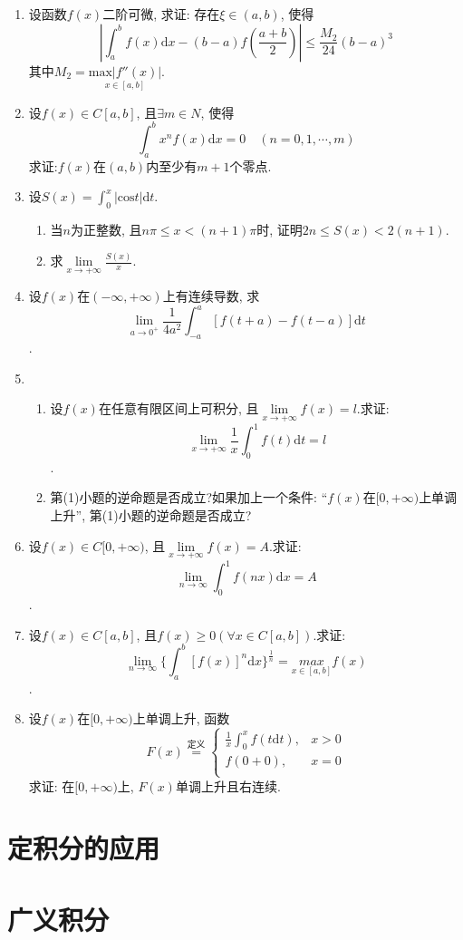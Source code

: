 \begin{enumerate}
\item 设函数$f(x)$二阶可微, 求证: 存在$\xi\in(a,b)$, 使得$$
	\displaystyle{|\int_{a}^{b}f(x)\mathrm{d}x-(b-a)f(\frac{a+b}{2})|\le \frac{M_2}{24}(b-a)^3}$$
	其中$M_2=\underset{x\in [a,b]}{\mathrm{max}|f''(x)|}$.
\item 设$f(x)\in C[a,b]$, 且$\exists m\in N$, 使得$$
\displaystyle{\int_{a}^{b}x^nf(x)\mathrm{d}x=0\quad (n=0,1,\cdots,m)}$$
求证:$f(x)$在$(a,b)$内至少有$m+1$个零点.
\item 设$S(x)=\displaystyle{\int_{0}^{x}|\mathrm{cos}t|\mathrm{d}t}$.
\begin{enumerate}
	\item 当$n$为正整数, 且$n\pi \le x <(n+1)\pi$时, 证明$2n\le S(x)<2(n+1)$.
	\item 求$\lim\limits_{x\rightarrow +\infty}\frac{S(x)}{x}$.
\end{enumerate} 
\item 设$f(x)$在$(-\infty,+\infty)$上有连续导数, 求
$$\lim\limits_{a\rightarrow 0^+}\frac{1}{4a^2}\int_{-a}^{a}[f(t+a)-f(t-a)]\mathrm{d}t $$.
\item 
\begin{enumerate}
	\item 设$f(x)$在任意有限区间上可积分, 且$\lim\limits_{x\rightarrow +\infty}f(x)=l$.求证:
	$$\lim\limits_{x\rightarrow +\infty}\frac{1}{x}\int_{0}^{1}f(t)\mathrm{d}t = l$$.
	\item  第(1)小题的逆命题是否成立?如果加上一个条件: “$f(x)$在$[0,+\infty)$上单调上升”, 第(1)小题的逆命题是否成立?
\end{enumerate}
\item 设$f(x)\in C[0,+\infty)$, 且$\lim\limits_{x\rightarrow +\infty}f(x)=A$.求证:
$$ \lim\limits_{n\rightarrow \infty}\int_{0}^{1}f(nx)\mathrm{d}x=A$$.
\item 设$f(x)\in C[a,b]$, 且$f(x)\ge 0(\forall x\in C[a,b])$.求证:
$$\lim\limits_{n\rightarrow \infty}\{\int_{a}^{b}[f(x)]^n\mathrm{d}x\}^{\frac{1}{n}} = \underset{x\in[a,b]}{max}f(x)$$.
\item 设$f(x)$在$[0,+\infty)$上单调上升, 函数
$$F(x) \overset{\text{定义}}{=}
\begin{cases}
\frac{1}{x}\displaystyle{\int_{0}^{x}f(t\mathrm{d}t)},&		x>0\\
f(0+0),&		x=0\\
\end{cases}
$$
求证: 在$[0,+\infty)$上, $F(x)$单调上升且右连续.
\end{enumerate}

\section{定积分的应用}
\section{广义积分}